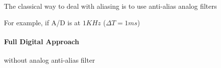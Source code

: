 
\begin{remark}

    The classical way to deal with aliasing is to use anti-alias analog filters


    For example, if A/D is at $1KHz$ ($\Delta T = 1ms$)

    \paragraph{Full Digital Approach} without analog anti-alias filter

\end{remark}
